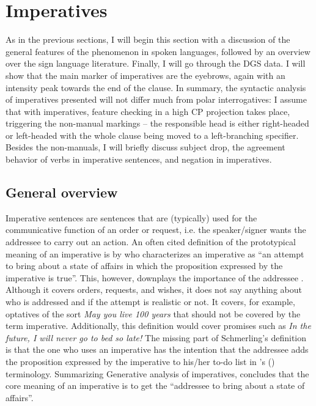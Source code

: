 \section{Imperatives}\label{generalsectionimperatives}
As in the previous sections, I will begin this section with a discussion of the general features of the phenomenon in spoken languages, followed by an overview over the sign language literature. Finally, I will go through the DGS data. I will show that the main marker of imperatives are the eyebrows, again with an intensity peak towards the end of the clause. In summary, the syntactic analysis of imperatives presented will not differ much from polar interrogatives: I assume that with imperatives, feature checking in a high CP projection takes place, triggering the non-manual markings -- the responsible head is either right-headed or left-headed with the whole clause being moved to a left-branching specifier. Besides the non-manuals, I will briefly discuss subject drop, the agreement behavior of verbs in imperative sentences, and negation in imperatives. 

\subsection{General overview}
Imperative sentences are sentences that are (typically) used for the communicative function of an order or request, i.e. the speaker/signer wants the addressee to carry out an action. An often cited definition of the prototypical meaning of an imperative is by \citet[212]{schmerling1982imperatives} who characterizes an imperative as ``an attempt to bring about a state of affairs in which the proposition expressed by the imperative is true''. This, however, downplays the importance of the addressee \citep[31]{van2007imperatives}. Although it covers orders, requests, and wishes, it does not say anything about who is addressed and if the attempt is realistic or not. It covers, for example, optatives of the sort \textit{May you live 100 years} that should not be covered by the term imperative. Additionally, this definition would cover promises such as \textit{In the future, I will never go to bed so late!} The missing part of Schmerling's definition is that the one who uses an imperative has the intention that the addressee adds the proposition expressed by the imperative to his/her to-do list in \citeauthor{portner2004semantics}'s (\citeyear{portner2004semantics}) terminology. Summarizing Generative analysis of imperatives, \citet[32]{van2007imperatives} concludes that the core meaning of an imperative is to get the ``addressee to bring about a state of affairs''. 

